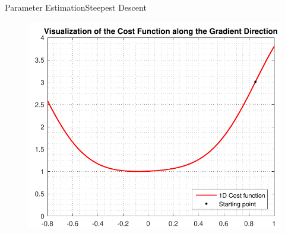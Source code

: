 \begin{frame}{Parameter Estimation}{Steepest Descent}
\begin{minipage}{\linewidth}
\begin{minipage}{0.45\linewidth}
      \begin{figure}[H]
        \centering
        \includegraphics[scale=0.33]{Pictures/gradientDIrection1D3.pdf}
      \end{figure}
    \end{minipage}
  \end{minipage}
\end{frame}

